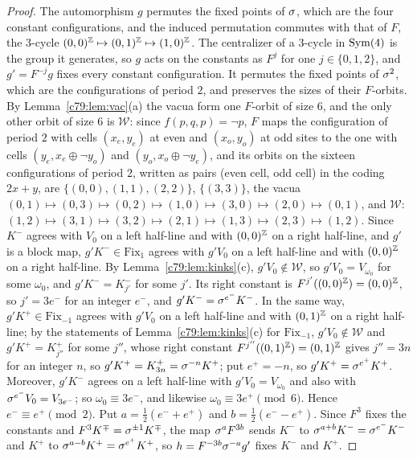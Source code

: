 \begin{proof}
The automorphism $g$ permutes the fixed points of $\sigma$, which are the four constant configurations, and the induced permutation commutes with that of $F$, the $3$-cycle $(0,0)^{\mathbb{Z}}\mapsto(0,1)^{\mathbb{Z}}\mapsto(1,0)^{\mathbb{Z}}$. The centralizer of a $3$-cycle in $\operatorname{Sym}(4)$ is the group it generates, so $g$ acts on the constants as $F^j$ for one $j\in\{0,1,2\}$, and $g'=F^{-j}g$ fixes every constant configuration. It permutes the fixed points of $\sigma^2$, which are the configurations of period $2$, and preserves the sizes of their $F$-orbits. By Lemma~\ref{c79:lem:vac}(a) the vacua form one $F$-orbit of size $6$, and the only other orbit of size $6$ is $\mathcal W$: since $f(p,q,p)=\neg p$, $F$ maps the configuration of period $2$ with cells $(x_e,y_e)$ at even and $(x_o,y_o)$ at odd sites to the one with cells $(y_e,x_e\oplus\neg y_o)$ and $(y_o,x_o\oplus\neg y_e)$, and its orbits on the sixteen configurations of period $2$, written as pairs (even cell, odd cell) in the coding $2x+y$, are $\{(0,0),(1,1),(2,2)\}$, $\{(3,3)\}$, the vacua $(0,1)\mapsto(0,3)\mapsto(0,2)\mapsto(1,0)\mapsto(3,0)\mapsto(2,0)\mapsto(0,1)$, and $\mathcal W$: $(1,2)\mapsto(3,1)\mapsto(3,2)\mapsto(2,1)\mapsto(1,3)\mapsto(2,3)\mapsto(1,2)$. Since $K^-$ agrees with $V_0$ on a left half-line and with $(0,0)^{\mathbb{Z}}$ on a right half-line, and $g'$ is a block map, $g'K^-\in\mathrm{Fix}_1$ agrees with $g'V_0$ on a left half-line and with $(0,0)^{\mathbb{Z}}$ on a right half-line. By Lemma~\ref{c79:lem:kinks}(c), $g'V_0\notin \mathcal W$, so $g'V_0=V_{\omega_0}$ for some $\omega_0$, and $g'K^-=K^-_{j'}$ for some $j'$. Its right constant is $F^{j'}((0,0)^{\mathbb{Z}})=(0,0)^{\mathbb{Z}}$, so $j'=3e^-$ for an integer $e^-$, and $g'K^-=\sigma^{e^-}K^-$. In the same way, $g'K^+\in\mathrm{Fix}_{-1}$ agrees with $g'V_0$ on a left half-line and with $(0,1)^{\mathbb{Z}}$ on a right half-line; by the statements of Lemma~\ref{c79:lem:kinks}(c) for $\mathrm{Fix}_{-1}$, $g'V_0\notin\mathcal W$ and $g'K^+=K^+_{j''}$ for some $j''$, whose right constant $F^{j''}((0,1)^{\mathbb{Z}})=(0,1)^{\mathbb{Z}}$ gives $j''=3n$ for an integer $n$, so $g'K^+=K^+_{3n}=\sigma^{-n}K^+$; put $e^+=-n$, so $g'K^+=\sigma^{e^+}K^+$. Moreover, $g'K^-$ agrees on a left half-line with $g'V_0=V_{\omega_0}$ and also with $\sigma^{e^-}V_0=V_{3e^-}$; so $\omega_0\equiv3e^-$, and likewise $\omega_0\equiv3e^+\pmod 6$. Hence $e^-\equiv e^+\pmod2$. Put $a=\frac12(e^-+e^+)$ and $b=\frac12(e^--e^+)$. Since $F^3$ fixes the constants and $F^3K^\mp=\sigma^{\pm1}K^\mp$, the map $\sigma^aF^{3b}$ sends $K^-$ to $\sigma^{a+b}K^-=\sigma^{e^-}K^-$ and $K^+$ to $\sigma^{a-b}K^+=\sigma^{e^+}K^+$, so $h=F^{-3b}\sigma^{-a}g'$ fixes $K^-$ and $K^+$.
\end{proof}

